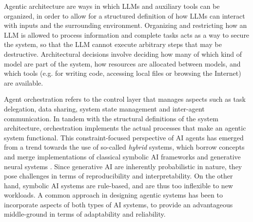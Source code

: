 \documentclass[conference]{IEEEtran}
\begin{document}
Agentic architecture are ways in which LLMs and auxiliary tools can be organized, in order to allow
for a structured definition of how LLMs can interact with inputs and the surrounding environment.
Organizing and restricting how an LLM is allowed to process information and complete tasks acts as a
way to secure the system, so that the LLM cannot execute arbitrary steps that may be destructive.
Architectural decisions involve deciding how many of which kind of model are part of the system, how
resources are allocated between models, and which tools (e.g. for writing code, accessing local
files or browsing the Internet) are available.

Agent orchestration refers to the control layer that manages aspects such as task delegation,
data sharing, system state management and inter-agent communication.
In tandem with the structural definitions of the system architecture, orchestration implements the
actual processes that make an agentic system functional.
This constraint-focused perspective of AI agents has emerged from a trend towards the use of
so-called \emph{hybrid} systems, which borrow concepts and merge implementations of classical symbolic
AI frameworks and generative neural systems \cite{ali_agentic_2025}.
Since generative AI are inherently probabilistic in nature, they pose challenges in terms of
reproducibility and interpretability.
On the other hand, symbolic AI systems are rule-based, and are thus too inflexible to new workloads.
A common approach in designing agentic systems has been to incorporate aspects of both types of AI
systems, to provide an advantageous middle-ground in terms of adaptability and reliability.
\end{document}
